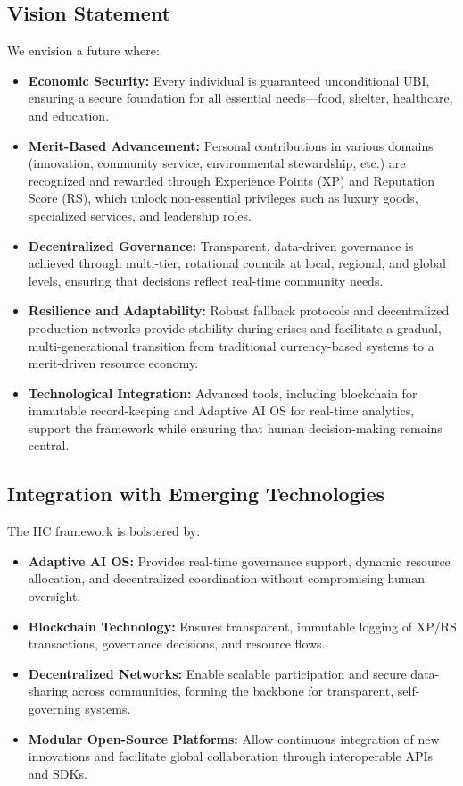 \documentclass[12pt]{article}
\begin{document}
\subsection{Vision Statement}
We envision a future where:
\begin{itemize}
    \item \textbf{Economic Security:} Every individual is guaranteed unconditional UBI, ensuring a secure foundation for all essential needs—food, shelter, healthcare, and education.
    \item \textbf{Merit-Based Advancement:} Personal contributions in various domains (innovation, community service, environmental stewardship, etc.) are recognized and rewarded through Experience Points (XP) and Reputation Score (RS), which unlock non-essential privileges such as luxury goods, specialized services, and leadership roles.
    \item \textbf{Decentralized Governance:} Transparent, data-driven governance is achieved through multi-tier, rotational councils at local, regional, and global levels, ensuring that decisions reflect real-time community needs.
    \item \textbf{Resilience and Adaptability:} Robust fallback protocols and decentralized production networks provide stability during crises and facilitate a gradual, multi-generational transition from traditional currency-based systems to a merit-driven resource economy.
    \item \textbf{Technological Integration:} Advanced tools, including blockchain for immutable record-keeping and Adaptive AI OS for real-time analytics, support the framework while ensuring that human decision-making remains central.
\end{itemize}

\subsection{Integration with Emerging Technologies}
The HC framework is bolstered by:
\begin{itemize}
    \item \textbf{Adaptive AI OS:} Provides real-time governance support, dynamic resource allocation, and decentralized coordination without compromising human oversight.
    \item \textbf{Blockchain Technology:} Ensures transparent, immutable logging of XP/RS transactions, governance decisions, and resource flows.
    \item \textbf{Decentralized Networks:} Enable scalable participation and secure data-sharing across communities, forming the backbone for transparent, self-governing systems.
    \item \textbf{Modular Open-Source Platforms:} Allow continuous integration of new innovations and facilitate global collaboration through interoperable APIs and SDKs.
\end{itemize}
\end{document}
